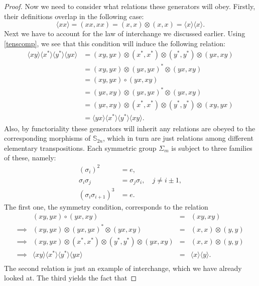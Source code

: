 \documentclass{amsbook} %
\numberwithin{section}{chapter}
\begin{document}
\begin{proof}
Now we need to consider what relations these generators will obey. Firstly, their definitions overlap in the following case:
  \[
    \langle xx \rangle = (xx,xx) = (x,x) \otimes (x,x) = \langle x \rangle\langle x \rangle.
  \]
Next we have to account for the law of interchange we discussed earlier. Using \cref{tenscomp}, we see that this condition will induce the following relation:
  \begin{align*}
  	\langle xy \rangle \langle x^* \rangle \langle y^* \rangle \langle yx \rangle & = (xy, yx) \otimes (x^*, x^*) \otimes (y^*, y^*) \otimes (yx, xy) \\
  	& = (xy, yx) \otimes (yx, yx)^* \otimes (yx, xy) \\
  	& = (xy,yx) \circ (yx, xy) \\
  	& = (yx, xy) \otimes (yx, yx)^* \otimes (yx, xy) \\
  	& = (yx, xy) \otimes (x^*, x^*) \otimes (y^*, y^*) \otimes (xy, yx) \\
  	& = \langle yx \rangle \langle x^* \rangle \langle y^* \rangle \langle xy \rangle.
  \end{align*}
Also, by functoriality these generators will inherit any relations are obeyed to the corresponding morphisms of $\mathbb{S}_{2n}$, which in turn are just relations among different elementary transpositions. Each symmetric group $\Sigma_m$ is subject to three families of these, namely:
  \begin{align*}
  	(\sigma_i)^2 & = e, \\
  	\sigma_i \sigma_j & = \sigma_j \sigma_i, \quad j \neq i \pm 1, \\
  	(\sigma_i \sigma_{i+1})^3 & = e.
  \end{align*}
The first one, the symmetry condition, corresponds to the relation
  \[
    \begin{array}{rrll}
      & (xy, yx) \circ (yx, xy) & = & (xy, xy) \\
      \implies & (xy, yx) \otimes (yx, yx)^* \otimes (yx, xy) & = & (x, x) \otimes (y,y) \\
      \implies & (xy, yx) \otimes (x^*, x^*) \otimes (y^*, y^*)  \otimes (yx, xy) & = & (x, x) \otimes (y,y) \\
      \implies & \langle xy \rangle\langle x^* \rangle\langle y^* \rangle\langle yx \rangle & = & \langle x \rangle\langle y \rangle. \\
    \end{array}
  \]
The second relation is just an example of interchange, which we have already looked at. The third yields the fact that

\end{proof}
\end{document}
